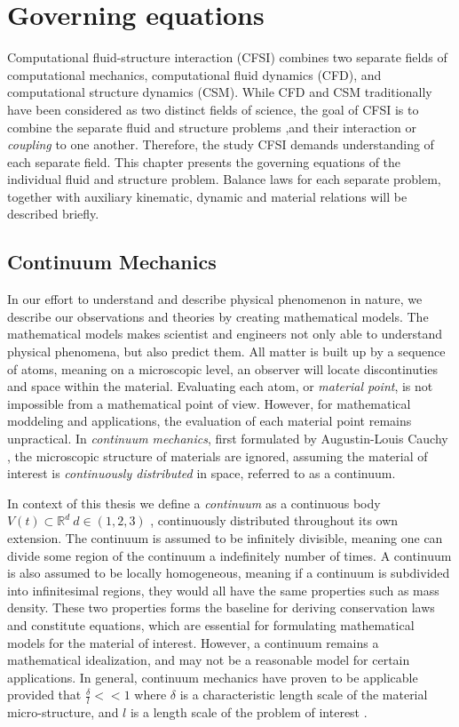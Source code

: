 \chapter{Governing equations}

Computational fluid-structure interaction (CFSI) combines two separate fields of computational mechanics, computational fluid dynamics (CFD), and computational structure dynamics (CSM). While CFD and CSM traditionally have been considered as two distinct fields of science,  the goal of CFSI is to combine the separate fluid and structure problems ,and their interaction or \textit{coupling} to one another. Therefore, the study CFSI demands understanding of each separate field. This chapter presents the governing equations of the individual fluid and structure problem. Balance laws for each separate problem,  together with auxiliary kinematic, dynamic and material relations will be described briefly.


\section{Continuum Mechanics}
In our effort to understand and describe physical phenomenon in nature, we describe our observations and theories by creating mathematical models. The mathematical models makes scientist and engineers not only able to understand physical phenomena, but also predict them.  All matter is built up by a sequence of atoms, meaning on a microscopic level, an observer will locate discontinuties and space within the material. Evaluating each atom, or \textit{material point}, is not impossible from a mathematical point of view. However, for mathematical moddeling and applications, the evaluation of each material point remains unpractical. In \textit{continuum mechanics}, first formulated by Augustin-Louis Cauchy \cite{Merodio2011}, the microscopic structure of materials are ignored,  assuming the material of interest is \textit{continuously distributed} in space, referred to as a continuum.


In context of this thesis we define a \textit{continuum} as a continuous body $V(t) \subset \mathbb{R}^d \ d \in (1, 2, 3)$ ,  continuously distributed throughout its own extension. The continuum is assumed to be infinitely divisible, meaning one can divide some region of the continuum a indefinitely number of times. A continuum is also assumed to be locally homogeneous, meaning if a continuum is subdivided into infinitesimal regions, they would all have the same properties such as mass density. These two properties forms the baseline for deriving conservation laws and constitute equations, which are essential for formulating mathematical models for the material of interest. However, a continuum remains a mathematical idealization, and may not be a reasonable model for certain applications. In general, continuum mechanics have proven to be applicable provided that $\frac{\delta}{l} << 1$ where $\delta$ is a characteristic length scale of the material micro-structure, and $l$ is a length scale of the problem of interest \cite{Humphrey2002}.

